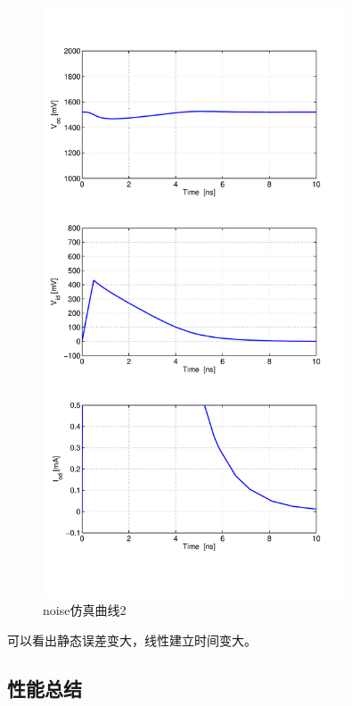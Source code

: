\documentclass[a4paper]{article}
\begin{document}
\begin{figure}[htb]
    \begin{center}
        \includegraphics[width=0.8\textwidth]{slow/tran2.pdf}
    \end{center}
    \caption{noise仿真曲线2}
    \label{slowtran2}
\end{figure}
可以看出静态误差变大，线性建立时间变大。

\newpage
\clearpage
\subsection{性能总结}
\end{document}
